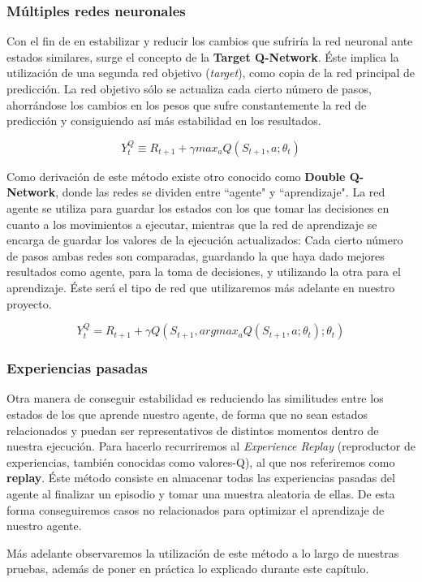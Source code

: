 \subsubsection{Múltiples redes neuronales}
Con el fin de en estabilizar y reducir los cambios que sufriría la red neuronal ante estados similares, surge el concepto de la \textbf{Target Q-Network}. Éste implica la utilización de una segunda red objetivo (\textit{target}), como copia de la red principal de predicción. La red objetivo sólo se actualiza cada cierto número de pasos, ahorrándose los cambios en los pesos que sufre constantemente la red de predicción y consiguiendo así más estabilidad en los resultados.

\begin{equation}
	Y^Q_{t} \equiv R_{t+1} + \gamma max_{a} Q(S_{t+1}, a; \theta_{t})
\end{equation}

Como derivación de este método existe otro conocido como \textbf{Double Q-Network}, donde las redes se dividen entre ``agente" y ``aprendizaje". La red agente se utiliza para guardar los estados con los que tomar las decisiones en cuanto a los movimientos a ejecutar, mientras que la red de aprendizaje se encarga de guardar los valores de la ejecución actualizados: Cada cierto número de pasos ambas redes son comparadas, guardando la que haya dado mejores resultados como agente, para la toma de decisiones, y utilizando la otra para el aprendizaje. Éste será el tipo de red que utilizaremos más adelante en nuestro proyecto.

\begin{equation}
	Y^Q_{t} = R_{t+1} + \gamma Q(S_{t+1}, argmax_{a} Q(S_{t+1}, a; \theta_{t}); \theta_{t})
\end{equation}

\subsubsection{Experiencias pasadas}
Otra manera de conseguir estabilidad es reduciendo las similitudes entre los estados de los que aprende nuestro agente, de forma que no sean estados relacionados y puedan ser representativos de distintos momentos dentro de nuestra ejecución. Para hacerlo recurriremos al \textit{Experience Replay} (reproductor de experiencias, también conocidas como valores-Q), al que nos referiremos como \textbf{replay}. Éste método consiste en almacenar todas las experiencias pasadas del agente al finalizar un episodio y tomar una muestra aleatoria de ellas. De esta forma conseguiremos casos no relacionados para optimizar el aprendizaje de nuestro agente.

Más adelante observaremos la utilización de este método a lo largo de nuestras pruebas, además de poner en práctica lo explicado durante este capítulo.